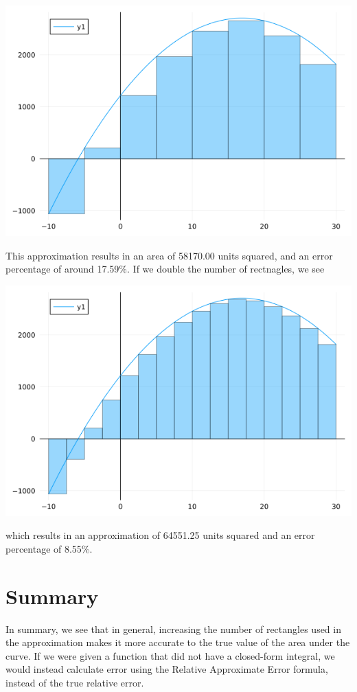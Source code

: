 \documentclass[12pt]{article}
\begin{document}
    \begin{center}
        \includegraphics*[scale=0.45]{images/LowerRAM_1.png}
    \end{center}
    This approximation results in an area of 58170.00 units squared, and an error percentage of around 17.59\%. 
    If we double the number of rectnagles, we see 
    \begin{center}
        \includegraphics*[scale=0.45]{images/LowerRAM_2.png}
    \end{center}
    which results in an approximation of 64551.25 units squared and an error percentage of 8.55\%.

\section{Summary}
    In summary, we see that in general, increasing the number of rectangles used in the approximation makes it more accurate to the true value of the area under the curve. 
    If we were given a function that did not have a closed-form integral, we would instead calculate error using the Relative Approximate Error formula, instead of the true relative error.
\end{document}
